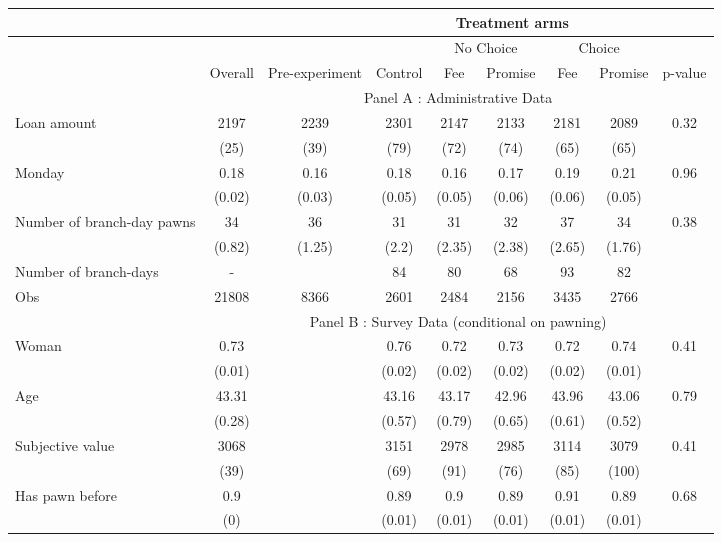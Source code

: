 \begin{tabular}{lcccccccc}
\toprule
      &       &       & \multicolumn{5}{c}{Treatment arms}    &  \\
\midrule
      &       &       &       & \multicolumn{2}{c}{No Choice } & \multicolumn{2}{c}{Choice} &  \\
\midrule
\midrule
      & Overall & Pre-experiment & Control & Fee   & Promise & Fee   & Promise & p-value \\
\midrule
      & \multicolumn{8}{c}{Panel A : Administrative Data} \\
\midrule
\midrule
Loan amount  & 2197  & 2239  & 2301  & 2147  & 2133  & 2181  & 2089  & 0.32 \\
      & (25)  & (39)  & (79)  & (72)  & (74)  & (65)  & (65)  &  \\
Monday & 0.18  & 0.16  & 0.18  & 0.16  & 0.17  & 0.19  & 0.21  & 0.96 \\
      & (0.02) & (0.03) & (0.05) & (0.05) & (0.06) & (0.06) & (0.05) &  \\
Number of branch-day pawns & 34    & 36    & 31    & 31    & 32    & 37    & 34    & 0.38 \\
      & (0.82) & (1.25) & (2.2) & (2.35) & (2.38) & (2.65) & (1.76) &  \\
\midrule
Number of branch-days & -     &       & 84    & 80    & 68    & 93    & 82    &  \\
Obs   & 21808 & 8366  & 2601  & 2484  & 2156  & 3435  & 2766  &  \\
\midrule
      & \multicolumn{8}{c}{Panel B : Survey Data (conditional on pawning)} \\
\midrule
\midrule
Woman & 0.73  &       & 0.76  & 0.72  & 0.73  & 0.72  & 0.74  & 0.41 \\
      & (0.01) &       & (0.02) & (0.02) & (0.02) & (0.02) & (0.01) &  \\
Age   & 43.31 &       & 43.16 & 43.17 & 42.96 & 43.96 & 43.06 & 0.79 \\
      & (0.28) &       & (0.57) & (0.79) & (0.65) & (0.61) & (0.52) &  \\
Subjective value & 3068  &       & 3151  & 2978  & 2985  & 3114  & 3079  & 0.41 \\
      & (39)  &       & (69)  & (91)  & (76)  & (85)  & (100) &  \\
Has pawn before & 0.9   &       & 0.89  & 0.9   & 0.89  & 0.91  & 0.89  & 0.68 \\
      & (0)   &       & (0.01) & (0.01) & (0.01) & (0.01) & (0.01) &  \\

\end{tabular}
